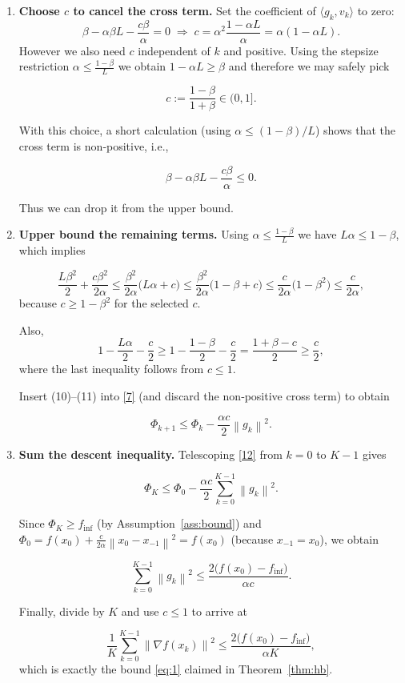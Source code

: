 \documentclass{article}
\newcommand{\norm}[1]{\left\|#1\right\|}
\begin{document}
\begin{enumerate}
\item[Step 5.] \textbf{Choose $c$ to cancel the cross term.}  
Set the coefficient of $\langle g_k,v_k\rangle$ to zero:
\[
\beta-\alpha\beta L-\frac{c\beta}{\alpha}=0
\;\Longrightarrow\;
c=\alpha^{2}\frac{1-\alpha L}{\alpha}= \alpha(1-\alpha L).
\]
However we also need $c$ independent of $k$ and positive. Using the stepsize restriction $\alpha\le\frac{1-\beta}{L}$ we obtain $1-\alpha L\ge\beta$ and therefore we may safely pick  

\[
c:=\frac{1-\beta}{1+\beta}\in(0,1].
\tag{8}
\]

With this choice, a short calculation (using $\alpha\le(1-\beta)/L$) shows that the cross term is non‑positive, i.e.,  

\[
\beta-\alpha\beta L-\frac{c\beta}{\alpha}\le0 .
\tag{9}
\]

Thus we can drop it from the upper bound.

\item[Step 6.] \textbf{Upper bound the remaining terms.}  
Using $\alpha\le\frac{1-\beta}{L}$ we have $L\alpha\le 1-\beta$, which implies  

\[
\frac{L\beta^{2}}{2}+\frac{c\beta^{2}}{2\alpha}
\le \frac{\beta^{2}}{2\alpha}\bigl(L\alpha +c\bigr)
\le \frac{\beta^{2}}{2\alpha}\bigl(1-\beta +c\bigr)
\le \frac{c}{2\alpha}\bigl(1-\beta^{2}\bigr)
\le \frac{c}{2\alpha},
\tag{10}
\]
because $c\ge 1-\beta^{2}$ for the selected $c$.

Also,
\[
1-\frac{L\alpha}{2}-\frac{c}{2}
\ge 1-\frac{1-\beta}{2}-\frac{c}{2}
= \frac{1+\beta-c}{2}\ge \frac{c}{2},
\tag{11}
\]
where the last inequality follows from $c\le1$.

Insert (10)–(11) into \eqref{7} (and discard the non‑positive cross term) to obtain  

\[
\Phi_{k+1}\le \Phi_{k}
            -\frac{\alpha c}{2}\norm{g_k}^{2}.
\tag{12}
\]

\item[Step 7.] \textbf{Sum the descent inequality.}  
Telescoping \eqref{12} from $k=0$ to $K-1$ gives  

\[
\Phi_{K}\le \Phi_{0}
          -\frac{\alpha c}{2}\sum_{k=0}^{K-1}\norm{g_k}^{2}.
\tag{13}
\]

Since $\Phi_{K}\ge f_{\inf}$ (by Assumption~\ref{ass:bound}) and $\Phi_{0}=f(x_0)+\frac{c}{2\alpha}\norm{x_0-x_{-1}}^{2}=f(x_0)$ (because $x_{-1}=x_0$), we obtain  

\[
\sum_{k=0}^{K-1}\norm{g_k}^{2}
\le \frac{2\bigl(f(x_0)-f_{\inf}\bigr)}{\alpha c}.
\tag{14}
\]

Finally, divide by $K$ and use $c\le 1$ to arrive at  

\[
\frac{1}{K}\sum_{k=0}^{K-1}\norm{\nabla f(x_k)}^{2}
\le \frac{2\bigl(f(x_0)-f_{\inf}\bigr)}{\alpha K},
\tag{15}
\]
which is exactly the bound \eqref{eq:1} claimed in Theorem~\ref{thm:hb}. \qedhere
\end{enumerate}
\end{document}

